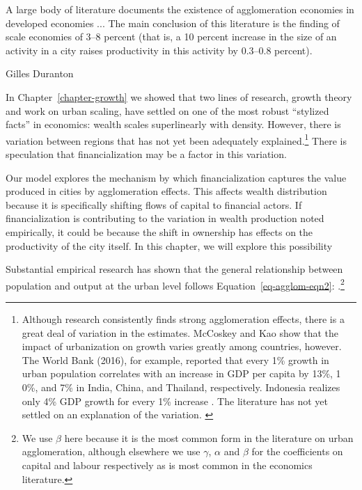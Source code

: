 \epigraph{A large body of literature documents the existence of agglomeration economies in developed economies ... The main conclusion of this literature is the finding of scale economies of 3--8 percent (that is, a 10 percent increase in the size of an activity in a city raises productivity in this activity by 0.3--0.8 percent).}{Gilles Duranton \cite{durantonAreCitiesEngines2009}} %





{\color{black} In Chapter~\ref{chapter-growth} we showed that two lines of research, growth theory and work on urban scaling, have settled on one of the most robust ``stylized facts'' in economics: wealth scales superlinearly with density. However, there is variation between regions that has not yet been adequately explained.\footnote{Although research consistently finds strong agglomeration effects, there is a great deal of variation in the estimates. McCoskey and Kao \cite{mccoskeyPanelDataInvestigation} show that the impact of urbanization on growth varies greatly among countries, however. The World Bank (2016), for example, reported that every 1\% growth in urban population correlates with an increase in GDP per capita by 13\%, 1
0\%, and 7\% in India, China, and Thailand, respectively. Indonesia realizes only 4\% GDP growth for every 1\% increase \cite{haryantotriRelationshipUrbanizationEducation2021}.  The literature has not yet settled on an explanation of the variation.  \cite{loboUrbanScalingProduction2013, pugaMagnitudeCausesAgglomeration2010} } There is speculation that financialization may be a factor in this variation. 

Our model explores the mechanism by which financialization captures the value produced in cities by agglomeration effects. This affects wealth distribution because it is specifically shifting flows of capital to financial actors. If financialization is contributing to the variation in wealth production noted empirically, it could be because the shift in ownership has effects on the productivity of the city itself. In this chapter, we will explore this possibility}

Substantial empirical research has shown that the general relationship  between population and output at the urban level %
follows Equation~\ref{eq-agglom-eqn2}: \cite{loboUrbanScalingProduction2013}.\footnote{We use $\beta$ here because it is the most common form in the literature on urban agglomeration, although elsewhere we use $\gamma$, $\alpha$ and $\beta$ for the coefficients on capital and labour respectively as is most common in the economics literature.}

